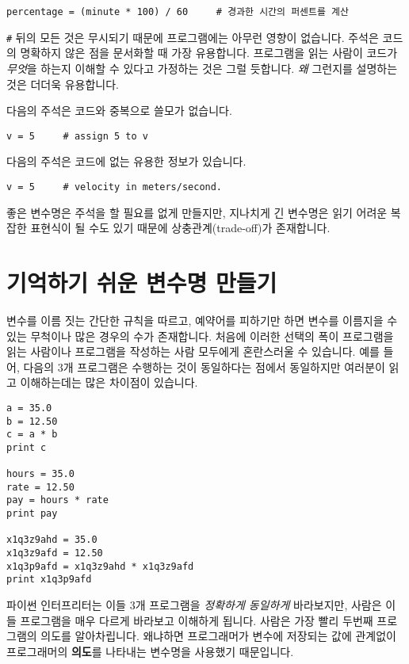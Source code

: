 \beforeverb
\begin{verbatim}
percentage = (minute * 100) / 60     # 경과한 시간의 퍼센트를 계산
\end{verbatim}
\afterverb
%

{\tt \#} 뒤의 모든 것은 무시되기 때문에 프로그램에는 아무런 영향이 없습니다.
주석은 코드의 명확하지 않은 점을 문서화할 때 가장 유용합니다. 프로그램을 읽는 사람이 코드가 \emph{무엇}을 하는지 이해할 수 있다고 가정하는 것은 그럴 듯합니다. \emph{왜} 그런지를 설명하는 것은 더더욱 유용합니다.

다음의 주석은 코드와 중복으로 쓸모가 없습니다.

\beforeverb
\begin{verbatim}
v = 5     # assign 5 to v
\end{verbatim}
\afterverb
%

다음의 주석은 코드에 없는 유용한 정보가 있습니다.

\beforeverb
\begin{verbatim}
v = 5     # velocity in meters/second. 
\end{verbatim}
\afterverb
%
좋은 변수명은 주석을 할 필요를 없게 만들지만, 지나치게 긴 변수명은 읽기 어려운 복잡한 표현식이 될 수도 있기 때문에 상충관계(trade-off)가 존재합니다.

\section{기억하기 쉬운 변수명 만들기}


변수를 이름 짓는 간단한 규칙을 따르고, 예약어를 피하기만 하면 변수를 이름지을 수 있는 무척이나 많은 경우의 수가 존재합니다. 처음에 이러한 선택의 폭이 프로그램을 읽는 사람이나 프로그램을 작성하는 사람 모두에게 혼란스러울 수 있습니다. 예를 들어, 다음의 3개 프로그램은 수행하는 것이 동일하다는 점에서 동일하지만 여러분이 읽고 이해하는데는 많은 차이점이 있습니다.

\beforeverb
\begin{verbatim}
a = 35.0
b = 12.50
c = a * b
print c

hours = 35.0
rate = 12.50
pay = hours * rate
print pay

x1q3z9ahd = 35.0
x1q3z9afd = 12.50
x1q3p9afd = x1q3z9ahd * x1q3z9afd
print x1q3p9afd
\end{verbatim}
\afterverb
%
파이썬 인터프리터는 이들 3개 프로그램을 \emph{정확하게 동일하게} 바라보지만, 사람은 이들 프로그램을 매우 다르게 바라보고 이해하게 됩니다. 사람은 가장 빨리 두번째 프로그램의 의도를 알아차립니다. 왜냐하면 프로그래머가 변수에 저장되는 값에 관계없이 프로그래머의 {\bf 의도}를 나타내는 변수명을 사용했기 때문입니다.

